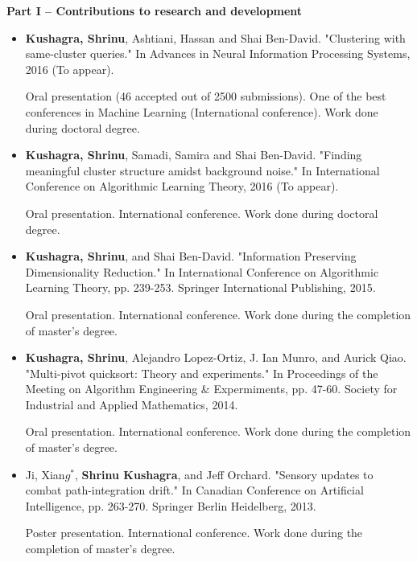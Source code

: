 \documentclass[12pt]{article}
\begin{document}
\linespread{0.901}

\noindent\textbf{Part I – Contributions to research and development}

\begin{itemize}[noitemsep]
\item  \textbf{Kushagra, Shrinu}, Ashtiani, Hassan and Shai Ben-David. "Clustering with same-cluster queries." In Advances in Neural Information Processing Systems, 2016 (To appear).

Oral presentation (46 accepted out of 2500 submissions). One of the best conferences in Machine Learning (International conference). Work done during doctoral degree.

\item  \textbf{Kushagra, Shrinu}, Samadi, Samira and Shai Ben-David. "Finding meaningful cluster structure amidst background noise." In International Conference on Algorithmic Learning Theory, 2016 (To appear).

Oral presentation. International conference. Work done during doctoral degree.
 
\item \textbf{Kushagra, Shrinu}, and Shai Ben-David. "Information Preserving Dimensionality Reduction." In International Conference on Algorithmic Learning Theory, pp. 239-253. Springer International Publishing, 2015.

Oral presentation. International conference. Work done during the completion of master's degree.

\item \textbf{Kushagra, Shrinu}, Alejandro Lopez-Ortiz, J. Ian Munro, and Aurick Qiao. "Multi-pivot quicksort: Theory and experiments." In Proceedings of the Meeting on Algorithm Engineering \& Expermiments, pp. 47-60. Society for Industrial and Applied Mathematics, 2014.

Oral presentation. International conference. Work done during the completion of master's degree.

\item Ji, Xian$g^*$, \textbf{Shrinu Kushagra}, and Jeff Orchard. "Sensory updates to combat path-integration drift." In Canadian Conference on Artificial Intelligence, pp. 263-270. Springer Berlin Heidelberg, 2013.

Poster presentation. International conference. Work done during the completion of master's degree.
\end{itemize}
\end{document}
